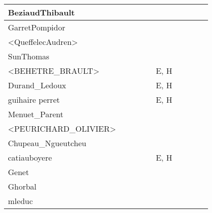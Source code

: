 \documentclass[a4paper]{article}
\begin{document}
\begin{table}[h!]
\begin{tabular}{|l|c|c|c|c|c|c|c|c|c|}
    BeziaudThibault         &       &       &       &       &       &       &       &       &       \\ \hline
    GarretPompidor          &       &       &       &       &       &       &       &       &       \\ \hline
    <QueffelecAudren>       &       &       &       &       &       &       &       &       &       \\ \hline
    SunThomas               &       &       &       &       &       &       &       &       &       \\ \hline
    <BEHETRE\_BRAULT>       &       &       &       &       & E, H  &       &       &       &       \\ \hline
    Durand\_Ledoux          &       &       &       &       & E, H  &       &       &       &       \\ \hline
    guihaire perret         &       &       &       &       & E, H  &       &       &       &       \\ \hline
    Menuet\_Parent          &       &       &       &       &       &       &       &       &       \\ \hline
    <PEURICHARD\_OLIVIER>   &       &       &       &       &       &       &       &       &       \\ \hline
    Chupeau\_Ngueutcheu     &       &       &       &       &       &       &       &       &       \\ \hline
    catiauboyere            &       &       &       &       & E, H  &       &       &       &       \\ \hline
    Genet                   &       &       &       &       &       &       &       &       &       \\ \hline
    Ghorbal                 &       &       &       &       &       &       &       &       &       \\ \hline
    mleduc                  &       &       &       &       &       &       &       &       &       \\ \hline
\end{tabular}
\end{table}
\end{document}
